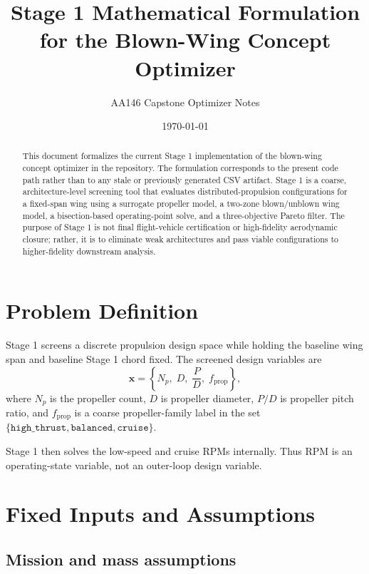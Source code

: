 \documentclass[11pt]{article}
\title{Stage 1 Mathematical Formulation for the Blown-Wing Concept Optimizer}
\author{AA146 Capstone Optimizer Notes}
\date{\today}
\begin{document}
\maketitle

\begin{abstract}
This document formalizes the current Stage 1 implementation of the blown-wing concept optimizer in the repository. The formulation corresponds to the present code path rather than to any stale or previously generated CSV artifact. Stage 1 is a coarse, architecture-level screening tool that evaluates distributed-propulsion configurations for a fixed-span wing using a surrogate propeller model, a two-zone blown/unblown wing model, a bisection-based operating-point solve, and a three-objective Pareto filter. The purpose of Stage 1 is not final flight-vehicle certification or high-fidelity aerodynamic closure; rather, it is to eliminate weak architectures and pass viable configurations to higher-fidelity downstream analysis.
\end{abstract}

\section{Problem Definition}

Stage 1 screens a discrete propulsion design space while holding the baseline wing span and baseline Stage 1 chord fixed. The screened design variables are
\begin{equation}
\mathbf{x} =
\left\{
N_p,\;
D,\;
\frac{P}{D},\;
f_{\mathrm{prop}}
\right\},
\end{equation}
where \(N_p\) is the propeller count, \(D\) is propeller diameter, \(P/D\) is propeller pitch ratio, and \(f_{\mathrm{prop}}\) is a coarse propeller-family label in the set
\(\{\texttt{high\_thrust}, \texttt{balanced}, \texttt{cruise}\}\).

Stage 1 then solves the low-speed and cruise RPMs internally. Thus RPM is an operating-state variable, not an outer-loop design variable.

\section{Fixed Inputs and Assumptions}

\subsection{Mission and mass assumptions}
\end{document}
